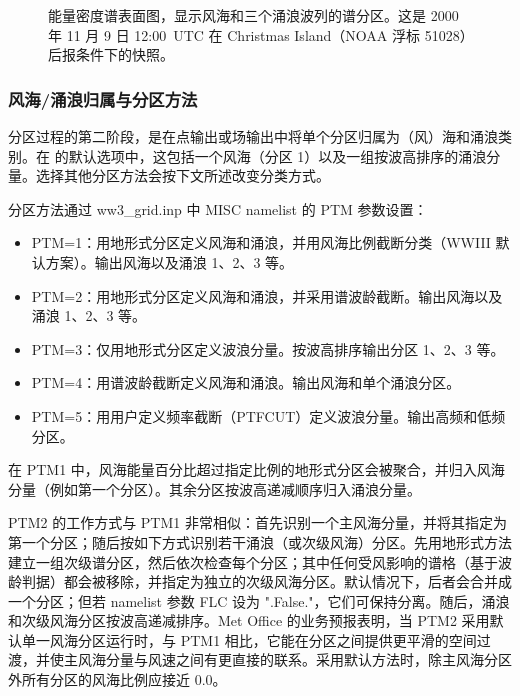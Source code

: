 \begin{figure} \begin{center}
\caption{能量密度谱表面图，显示风海和三个涌浪波列的谱分区。这是 2000 年 11 月 9 日 12:00~UTC 在 Christmas Island（NOAA 浮标 51028）后报条件下的快照。}
         \label{fig:partitions} \botline
\end{center}
\end{figure}

\subsubsection{风海/涌浪归属与分区方法}

分区过程的第二阶段，是在点输出或场输出中将单个分区归属为（风）海和涌浪类别。在 \ws{} 的默认选项中，这包括一个风海（分区 1）以及一组按波高排序的涌浪分量。选择其他分区方法会按下文所述改变分类方式。

分区方法通过 ww3\_grid.inp 中 MISC namelist 的 PTM 参数设置：
\begin{itemize}

 \item PTM=1：用地形式分区定义风海和涌浪，并用风海比例截断分类（WWIII 默认方案）。输出风海以及涌浪 1、2、3 等。

 \item PTM=2：用地形式分区定义风海和涌浪，并采用谱波龄截断。输出风海以及涌浪 1、2、3 等。
		  
 \item PTM=3：仅用地形式分区定义波浪分量。按波高排序输出分区 1、2、3 等。

 \item PTM=4：用谱波龄截断定义风海和涌浪。输出风海和单个涌浪分区。

 \item PTM=5：用用户定义频率截断（PTFCUT）定义波浪分量。输出高频和低频分区。
\end{itemize}

在 PTM1 中，风海能量百分比超过指定比例的地形式分区会被聚合，并归入风海分量（例如第一个分区）。其余分区按波高递减顺序归入涌浪分量。

PTM2 的工作方式与 PTM1 非常相似：首先识别一个主风海分量，并将其指定为第一个分区；随后按如下方式识别若干涌浪（或次级风海）分区。先用地形式方法建立一组次级谱分区，然后依次检查每个分区；其中任何受风影响的谱格（基于波龄判据）都会被移除，并指定为独立的次级风海分区。默认情况下，后者会合并成一个分区；但若 namelist 参数 FLC 设为 ".False."，它们可保持分离。随后，涌浪和次级风海分区按波高递减排序。Met Office 的业务预报表明，当 PTM2 采用默认单一风海分区运行时，与 PTM1 相比，它能在分区之间提供更平滑的空间过渡，并使主风海分量与风速之间有更直接的联系。采用默认方法时，除主风海分区外所有分区的风海比例应接近 0.0。

